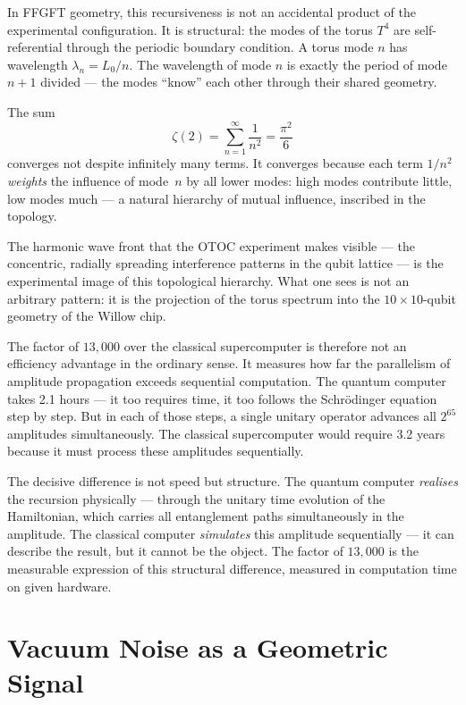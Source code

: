 In FFGFT geometry, this recursiveness is not an accidental product of the
experimental configuration. It is structural: the modes of the torus $T^4$ are
self-referential through the periodic boundary condition.
A torus mode $n$ has wavelength $\lambda_n = L_0/n$. The wavelength of mode $n$
is exactly the period of mode $n+1$ divided — the modes ``know'' each other through
their shared geometry.

The sum
\begin{equation}
    \zeta(2) = \sum_{n=1}^{\infty} \frac{1}{n^2} = \frac{\pi^2}{6}
\end{equation}
converges not despite infinitely many terms. It converges because each term $1/n^2$
\emph{weights} the influence of mode~$n$ by all lower modes: high modes contribute
little, low modes much — a natural hierarchy of mutual influence, inscribed in the
topology.

The harmonic wave front that the OTOC experiment makes visible — the concentric,
radially spreading interference patterns in the qubit lattice — is the experimental
image of this topological hierarchy. What one sees is not an arbitrary pattern: it is
the projection of the torus spectrum into the $10 \times 10$-qubit geometry of the
Willow chip.

The factor of $13{,}000$ over the classical supercomputer is therefore not an
efficiency advantage in the ordinary sense. It measures how far the parallelism
of amplitude propagation exceeds sequential computation. The quantum computer
takes 2.1 hours — it too requires time, it too follows the Schrödinger equation
step by step. But in each of those steps, a single unitary operator advances all
$2^{65}$ amplitudes simultaneously. The classical supercomputer would require
3.2 years because it must process these amplitudes sequentially.

\begin{foundation}
The decisive difference is not speed but structure.
The quantum computer \emph{realises} the recursion physically — through the unitary
time evolution of the Hamiltonian, which carries all entanglement paths simultaneously
in the amplitude.
The classical computer \emph{simulates} this amplitude sequentially — it can
describe the result, but it cannot be the object.
The factor of $13{,}000$ is the measurable expression of this structural difference,
measured in computation time on given hardware.
\end{foundation}


\section{Vacuum Noise as a Geometric Signal}


